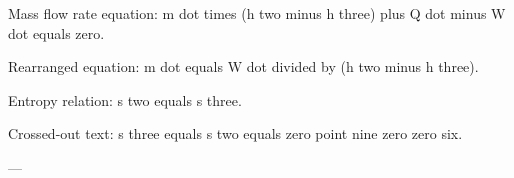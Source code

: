 Mass flow rate equation:  
m dot times (h two minus h three) plus Q dot minus W dot equals zero.  

Rearranged equation:  
m dot equals W dot divided by (h two minus h three).  

Entropy relation:  
s two equals s three.  

Crossed-out text:  
s three equals s two equals zero point nine zero zero six.  

---
